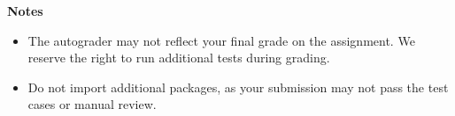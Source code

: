 \documentclass{article}
\begin{document}
    \vspace{3mm}
    \textbf{Notes}

    \begin{itemize}
        \item The autograder may not reflect your final grade on the assignment. We reserve the right to run additional tests during grading.
        \item Do not import additional packages, as your submission may not pass the test cases or manual review.
    \end{itemize}
    
\end{document}
